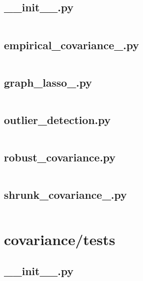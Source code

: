 \documentclass{article}
\begin{document}
\subsection{\_\_init\_\_.py}
\inputminted{python}{/home/dufferzafar/dev/@clones/scikit-learn/sklearn/covariance/__init__.py}
\newpage

\subsection{empirical\_covariance\_.py}
\inputminted{python}{/home/dufferzafar/dev/@clones/scikit-learn/sklearn/covariance/empirical_covariance_.py}
\newpage

\subsection{graph\_lasso\_.py}
\inputminted{python}{/home/dufferzafar/dev/@clones/scikit-learn/sklearn/covariance/graph_lasso_.py}
\newpage

\subsection{outlier\_detection.py}
\inputminted{python}{/home/dufferzafar/dev/@clones/scikit-learn/sklearn/covariance/outlier_detection.py}
\newpage

\subsection{robust\_covariance.py}
\inputminted{python}{/home/dufferzafar/dev/@clones/scikit-learn/sklearn/covariance/robust_covariance.py}
\newpage

\subsection{shrunk\_covariance\_.py}
\inputminted{python}{/home/dufferzafar/dev/@clones/scikit-learn/sklearn/covariance/shrunk_covariance_.py}
\newpage

\section{covariance/tests}

\subsection{\_\_init\_\_.py}
\inputminted{python}{/home/dufferzafar/dev/@clones/scikit-learn/sklearn/covariance/tests/__init__.py}
\newpage
\end{document}
